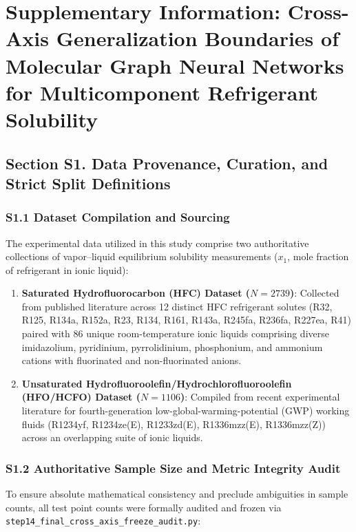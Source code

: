 \section*{Supplementary Information: Cross-Axis Generalization Boundaries of Molecular Graph Neural Networks for Multicomponent Refrigerant Solubility}
\label{sec:si}

\subsection*{Section S1. Data Provenance, Curation, and Strict Split Definitions}

\subsubsection*{S1.1 Dataset Compilation and Sourcing}
The experimental data utilized in this study comprise two authoritative collections of vapor--liquid equilibrium solubility measurements ($x_1$, mole fraction of refrigerant in ionic liquid):
\begin{enumerate}
    \item \textbf{Saturated Hydrofluorocarbon (HFC) Dataset ($N=2739$)}: Collected from published literature across 12 distinct HFC refrigerant solutes (R32, R125, R134a, R152a, R23, R134, R161, R143a, R245fa, R236fa, R227ea, R41) paired with 86 unique room-temperature ionic liquids comprising diverse imidazolium, pyridinium, pyrrolidinium, phosphonium, and ammonium cations with fluorinated and non-fluorinated anions.
    \item \textbf{Unsaturated Hydrofluoroolefin/Hydrochlorofluoroolefin (HFO/HCFO) Dataset ($N=1106$)}: Compiled from recent experimental literature for fourth-generation low-global-warming-potential (GWP) working fluids (R1234yf, R1234ze(E), R1233zd(E), R1336mzz(E), R1336mzz(Z)) across an overlapping suite of ionic liquids.
\end{enumerate}

\subsubsection*{S1.2 Authoritative Sample Size and Metric Integrity Audit}
To ensure absolute mathematical consistency and preclude ambiguities in sample counts, all test point counts were formally audited and frozen via \texttt{step14\_final\_cross\_axis\_freeze\_audit.py}:

